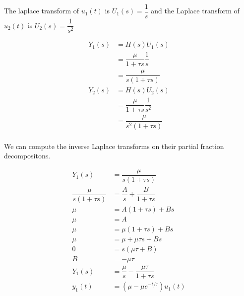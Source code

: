 \documentclass[11pt]{article}
\begin{document}
The laplace transform of $u_1(t)$ is $U_1(s) = \dfrac{1}{s}$ and the Laplace transform of $u_2(t)$ is $U_2(s) = \dfrac{1}{s^2}$

\begin{align*}
    Y_1(s) &= H(s) U_1(s) \\
     &= \dfrac{\mu}{1 + \tau s} \dfrac{1}{s} \\
     &= \dfrac{\mu}{s(1 + \tau s)} \\
    Y_2(s) &= H(s) U_2(s) \\
    &= \dfrac{\mu}{1 +\tau s} \dfrac{1}{s^2} \\
    &= \dfrac{\mu}{s^2(1 + \tau s)} \\
\end{align*}

We can compute the inverse Laplace transforms on their partial fraction decompositons.

\begin{align*}
    Y_1(s) &= \dfrac{\mu}{s(1 + \tau s)} \\
    \dfrac{\mu}{s(1 + \tau s)} &= \dfrac{A}{s} + \dfrac{B}{1 + \tau s} \\
    \mu &= A(1 + \tau s) + Bs \\
    \mu &= A \tag{s = 0} \\ 
    \mu &= \mu (1 + \tau s) + Bs \\
    \mu &= \mu + \mu \tau s + Bs \\
    0 &= s (\mu \tau + B) \tag{$s \neq 0$} \\
    B &= -\mu \tau \\
    Y_1(s) &= \dfrac{\mu}{s} - \dfrac{\mu \tau}{1 + \tau s} \\
    y_1(t) &= (\mu - \mu e^{-t / \tau}) u_1(t) \\
\end{align*}
\end{document}
